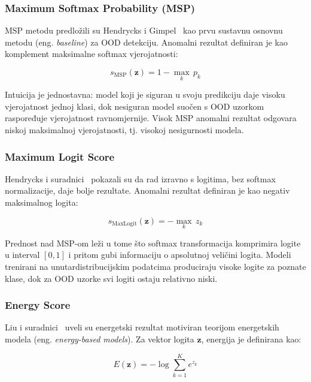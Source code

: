\documentclass[diplomskirad]{fer}
\begin{document}
\subsubsection{Maximum Softmax Probability (MSP)}

MSP metodu predložili su Hendrycks i Gimpel~\cite{hendrycks2017baseline} kao prvu sustavnu osnovnu metodu (eng. \textit{baseline}) za OOD detekciju. Anomalni rezultat definiran je kao komplement maksimalne softmax vjerojatnosti:

\begin{equation}
	s_{\text{MSP}}(\mathbf{z}) = 1 - \max_{k} \, p_k
\end{equation}

Intuicija je jednostavna: model koji je siguran u svoju predikciju daje visoku vjerojatnost jednoj klasi, dok nesiguran model suočen s OOD uzorkom raspoređuje vjerojatnost ravnomjernije. Visok MSP anomalni rezultat odgovara niskoj maksimalnoj vjerojatnosti, tj. visokoj nesigurnosti modela.

\subsubsection{Maximum Logit Score}

Hendrycks i suradnici~\cite{hendrycks2019scaling} pokazali su da rad izravno s logitima, bez softmax normalizacije, daje bolje rezultate. Anomalni rezultat definiran je kao negativ maksimalnog logita:

\begin{equation}
	s_{\text{MaxLogit}}(\mathbf{z}) = -\max_{k} \, z_k
\end{equation}

Prednost nad MSP-om leži u tome što softmax transformacija komprimira logite u interval $[0, 1]$ i pritom gubi informaciju o apsolutnoj veličini logita. Modeli trenirani na unutardistribucijskim podatcima produciraju visoke logite za poznate klase, dok za OOD uzorke svi logiti ostaju relativno niski.

\subsubsection{Energy Score}

Liu i suradnici~\cite{liu2020energybasedoutdistributiondetection} uveli su energetski rezultat motiviran teorijom energetskih modela (eng. \textit{energy-based models}). Za vektor logita $\mathbf{z}$, energija je definirana kao:

\begin{equation}
	E(\mathbf{z}) = -\log \sum_{k=1}^{K} e^{z_k}
\end{equation}
\end{document}
